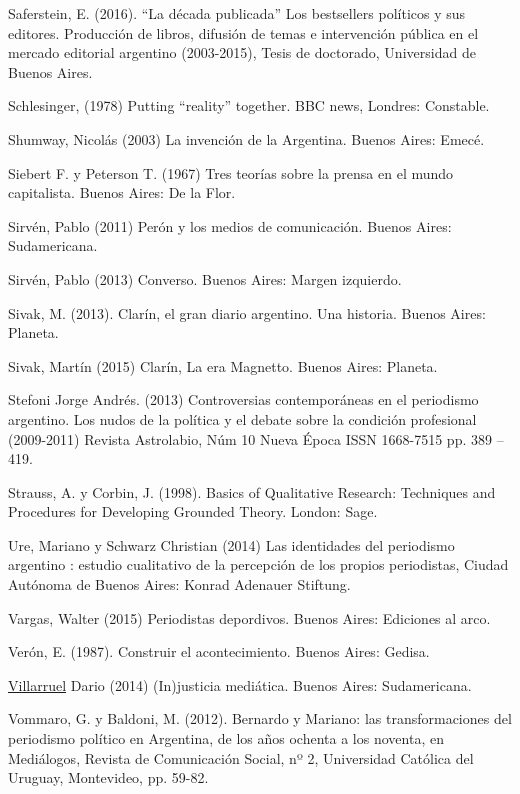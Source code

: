 Saferstein, E. (2016). ``La década publicada'' Los bestsellers políticos y sus editores. Producción de libros, difusión de temas e intervención pública en el mercado editorial argentino (2003-2015), Tesis de doctorado, Universidad de Buenos Aires.

Schlesinger, (1978) Putting ``reality'' together. BBC news, Londres: Constable.

Shumway, Nicolás (2003) La invención de la Argentina. Buenos Aires: Emecé.

Siebert F. y Peterson T. (1967) Tres teorías sobre la prensa en el mundo capitalista. Buenos Aires: De la Flor.

Sirvén, Pablo (2011) Perón y los medios de comunicación. Buenos Aires: Sudamericana.

Sirvén, Pablo (2013) Converso. Buenos Aires: Margen izquierdo.

Sivak, M. (2013). Clarín, el gran diario argentino. Una historia. Buenos Aires: Planeta.

Sivak, Martín (2015) Clarín, La era Magnetto. Buenos Aires: Planeta.

Stefoni Jorge Andrés. (2013) Controversias contemporáneas en el periodismo argentino. Los nudos de la política y el debate sobre la condición profesional (2009-2011) Revista Astrolabio, Núm 10 Nueva Época ISSN 1668-7515 pp. 389 -- 419.

Strauss, A. y Corbin, J. (1998). Basics of Qualitative Research: Techniques and Procedures for Developing Grounded Theory. London: Sage.

Ure, Mariano y Schwarz Christian (2014) Las identidades del periodismo argentino : estudio cualitativo de la percepción de los propios periodistas, Ciudad Autónoma de Buenos Aires: Konrad Adenauer Stiftung.

Vargas, Walter (2015) Periodistas depordivos. Buenos Aires: Ediciones al arco.

Verón, E. (1987). Construir el acontecimiento. Buenos Aires: Gedisa.

\href{http://www.cuspide.com/resultados.aspx?c=VILLARRUEL+DARIO\&por=AutorEstricto\&aut=291343\&orden=fecha}{Villarruel} Dario (2014) (In)justicia mediática. Buenos Aires: Sudamericana.

Vommaro, G. y Baldoni, M. (2012). Bernardo y Mariano: las transformaciones del periodismo político en Argentina, de los años ochenta a los noventa, en Mediálogos, Revista de Comunicación Social, nº 2, Universidad Católica del Uruguay, Montevideo, pp. 59-82.

